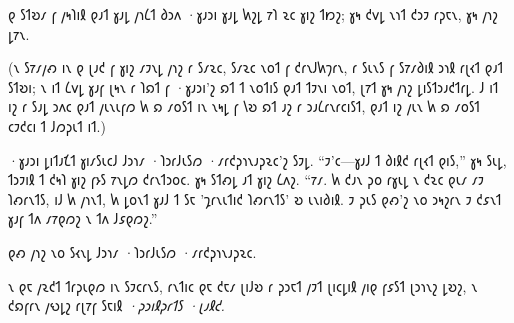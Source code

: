 𐑞 𐑕𐑑𐑹𐑥 𐑝 𐑢𐑰𐑐𐑦𐑙 𐑞𐑨𐑑 𐑣𐑨𐑛 𐑢𐑪𐑖𐑑 𐑔𐑮𐑵 ·𐑣𐑨𐑮𐑦 𐑣𐑨𐑛 𐑿𐑟𐑛 𐑳𐑐 𐑷𐑤 𐑣𐑦𐑟 𐑑𐑽𐑟; 𐑣𐑰 𐑒𐑫𐑛 𐑯𐑪𐑑 𐑒𐑮𐑲 𐑩𐑜𐑱𐑯, 𐑣𐑰 𐑢𐑪𐑟 𐑛𐑳𐑯.

(𐑯 𐑕𐑳𐑥𐑢𐑺 𐑦𐑯 𐑞 𐑚𐑨𐑒 𐑝 𐑣𐑦𐑟 𐑥𐑲𐑯𐑛 𐑢𐑪𐑟 𐑩 𐑕𐑥𐑷𐑤, 𐑕𐑥𐑷𐑤 𐑯𐑴𐑑 𐑝 𐑒𐑩𐑯𐑓𐑿𐑠𐑩𐑯, 𐑩 𐑕𐑧𐑯𐑕 𐑝 𐑕𐑳𐑥𐑔𐑦𐑙 𐑮𐑪𐑙 𐑩𐑚𐑬𐑑 𐑞𐑨𐑑 𐑕𐑑𐑹𐑦; 𐑯 𐑦𐑑 𐑖𐑫𐑛 𐑣𐑨𐑝 𐑚𐑰𐑯 𐑩 𐑐𐑸𐑑 𐑝 ·𐑣𐑨𐑮𐑦'𐑟 𐑸𐑑 𐑑 𐑯𐑴𐑑𐑦𐑕 𐑞𐑨𐑑 𐑑𐑲𐑯𐑦 𐑯𐑴𐑑, 𐑚𐑳𐑑 𐑣𐑰 𐑢𐑪𐑟 𐑛𐑦𐑕𐑑𐑮𐑨𐑒𐑑𐑩𐑛. 𐑓 𐑦𐑑 𐑦𐑟 𐑩 𐑕𐑨𐑛 𐑮𐑵𐑤 𐑞𐑨𐑑 𐑢𐑧𐑯𐑧𐑝𐑼 𐑿 𐑸 𐑥𐑴𐑕𐑑 𐑦𐑯 𐑯𐑰𐑛 𐑝 𐑘𐑹 𐑸𐑑 𐑨𐑟 𐑩 𐑮𐑨𐑖𐑩𐑯𐑩𐑤𐑦𐑕𐑑, 𐑞𐑨𐑑 𐑦𐑟 𐑢𐑧𐑯 𐑿 𐑸 𐑥𐑴𐑕𐑑 𐑤𐑲𐑒𐑤𐑦 𐑑 𐑓𐑼𐑜𐑧𐑑 𐑦𐑑.)

·𐑣𐑨𐑮𐑦 𐑛𐑦𐑑𐑨𐑗𐑑 𐑣𐑦𐑥𐑕𐑧𐑤𐑓 𐑓𐑮𐑪𐑥 ·𐑐𐑮𐑩𐑓𐑧𐑕𐑼 ·𐑥𐑩𐑒𐑜𐑪𐑯𐑨𐑜𐑷𐑤'𐑟 𐑕𐑲𐑛. “𐑲'𐑤—𐑣𐑨𐑓 𐑑 𐑔𐑦𐑙𐑒 𐑩𐑚𐑬𐑑 𐑞𐑦𐑕,” 𐑣𐑰 𐑕𐑧𐑛, 𐑑𐑮𐑲𐑦𐑙 𐑑 𐑒𐑰𐑐 𐑣𐑦𐑟 𐑝𐑶𐑕 𐑳𐑯𐑛𐑼 𐑒𐑩𐑯𐑑𐑮𐑴𐑤. 𐑣𐑰 𐑕𐑑𐑺𐑛 𐑨𐑑 𐑣𐑦𐑟 𐑖𐑵𐑟. “𐑳𐑥. 𐑿 𐑒𐑨𐑯 𐑜𐑴 𐑩𐑣𐑧𐑛 𐑯 𐑒𐑷𐑤 𐑞𐑧𐑥 𐑥𐑲 𐑐𐑺𐑩𐑯𐑑𐑕, 𐑦𐑓 𐑿 𐑢𐑪𐑯𐑑, 𐑿 𐑛𐑴𐑯𐑑 𐑣𐑨𐑓 𐑑 𐑕𐑱 '𐑡𐑩𐑯𐑧𐑑𐑦𐑒 𐑐𐑺𐑩𐑯𐑑𐑕' 𐑹 𐑧𐑯𐑦𐑔𐑦𐑙. 𐑲 𐑜𐑧𐑕 𐑞𐑺'𐑟 𐑯𐑴 𐑮𐑰𐑟𐑩𐑯 𐑲 𐑒𐑭𐑯𐑑 𐑣𐑨𐑝 𐑑𐑵 𐑥𐑳𐑞𐑼𐑟 𐑯 𐑑𐑵 𐑓𐑭𐑞𐑼𐑟.”

𐑞𐑺 𐑢𐑪𐑟 𐑯𐑴 𐑕𐑬𐑯𐑛 𐑓𐑮𐑪𐑥 ·𐑐𐑮𐑩𐑓𐑧𐑕𐑼 ·𐑥𐑩𐑒𐑜𐑪𐑯𐑨𐑜𐑷𐑤.

𐑯 𐑞𐑱 𐑢𐑷𐑒𐑑 𐑑𐑩𐑜𐑧𐑞𐑼 𐑦𐑯 𐑕𐑲𐑤𐑩𐑯𐑕, 𐑩𐑯𐑑𐑦𐑤 𐑞𐑱 𐑒𐑱𐑥 𐑚𐑦𐑓𐑹 𐑩 𐑜𐑮𐑱𐑑 𐑢𐑲𐑑 𐑚𐑦𐑤𐑛𐑦𐑙 𐑢𐑦𐑞 𐑝𐑭𐑕𐑑 𐑚𐑮𐑪𐑯𐑟 𐑛𐑹𐑟, 𐑯 𐑒𐑸𐑝𐑩𐑯 𐑢𐑻𐑛𐑟 𐑩𐑚𐑳𐑝 𐑕𐑱𐑦𐑙 \emph{·𐑜𐑮𐑦𐑙𐑜𐑩𐑑𐑕 ·𐑚𐑨𐑙𐑒.}

